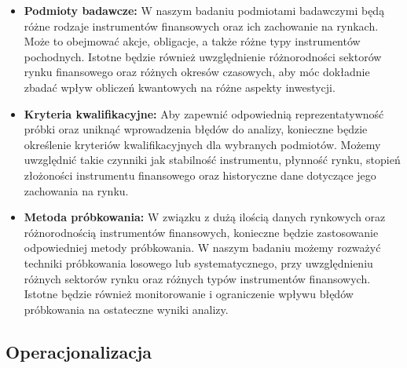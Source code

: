 \documentclass[polish,envcountsect,10pt]{article}
\begin{document}
\begin{itemize}
	\item \textbf{Podmioty badawcze:} W naszym badaniu podmiotami badawczymi będą różne rodzaje instrumentów finansowych oraz ich zachowanie na rynkach. Może to obejmować akcje, obligacje, a także różne typy instrumentów pochodnych. Istotne będzie również uwzględnienie różnorodności sektorów rynku finansowego oraz różnych okresów czasowych, aby móc dokładnie zbadać wpływ obliczeń kwantowych na różne aspekty inwestycji.
    
	\item \textbf{Kryteria kwalifikacyjne:} Aby zapewnić odpowiednią reprezentatywność próbki oraz uniknąć wprowadzenia błędów do analizy, konieczne będzie określenie kryteriów kwalifikacyjnych dla wybranych podmiotów. Możemy uwzględnić takie czynniki jak stabilność instrumentu, płynność rynku, stopień złożoności instrumentu finansowego oraz historyczne dane dotyczące jego zachowania na rynku.
    
	\item \textbf{Metoda próbkowania:} W związku z dużą ilością danych rynkowych oraz różnorodnością instrumentów finansowych, konieczne będzie zastosowanie odpowiedniej metody próbkowania. W naszym badaniu możemy rozważyć techniki próbkowania losowego lub systematycznego, przy uwzględnieniu różnych sektorów rynku oraz różnych typów instrumentów finansowych. Istotne będzie również monitorowanie i ograniczenie wpływu błędów próbkowania na ostateczne wyniki analizy.
\end{itemize}

\subsection{Operacjonalizacja}
\end{document}
